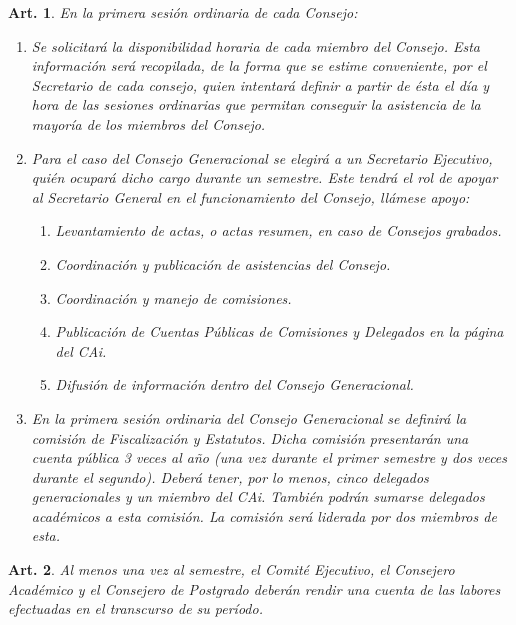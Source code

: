 \documentclass[letterpaper,11pt]{article}
\theoremstyle{plain}
\newtheorem{art}{Art.} %
\begin{document}
			\begin{art}\label{fijarAsistencias}
				En la primera sesión ordinaria de cada Consejo:
				\begin{enumerate}
					\item Se solicitará la disponibilidad horaria de cada miembro del Consejo. Esta información será recopilada, de la forma que se estime conveniente, por el Secretario de cada consejo, quien intentará definir a partir de ésta el día y hora de las sesiones ordinarias que permitan conseguir la asistencia de la mayoría de los miembros del Consejo.
					
					\item Para el caso del Consejo Generacional se elegirá a un Secretario Ejecutivo, quién ocupará dicho cargo durante un semestre. Este tendrá el rol de apoyar al Secretario General en el funcionamiento del Consejo, llámese apoyo:
						\begin{enumerate}
							\item Levantamiento de actas, o actas resumen, en caso de Consejos grabados.
							\item Coordinación y publicación de asistencias del Consejo.
							\item Coordinación y manejo de comisiones.
							\item Publicación de Cuentas Públicas de Comisiones y Delegados en la página del CAi.
							\item Difusión de información dentro del Consejo Generacional.
						\end{enumerate}
					
					\item En la primera sesión ordinaria del Consejo Generacional se definirá la comisión de Fiscalización y Estatutos. Dicha comisión presentarán una cuenta pública 3 veces al año (una vez durante el primer semestre y dos veces durante el segundo). Deberá tener, por lo menos, cinco delegados generacionales y un miembro del CAi. También podrán sumarse delegados académicos a esta comisión. La comisión será liderada por dos miembros de esta.
				\end{enumerate}
			\end{art}

			\begin{art}\label{cuentasPublicasSemestrales}
				Al menos una vez al semestre, el Comité Ejecutivo, el Consejero Académico y el Consejero de Postgrado deberán rendir una cuenta de las labores efectuadas en el transcurso de su período.
			\end{art}
\end{document}

